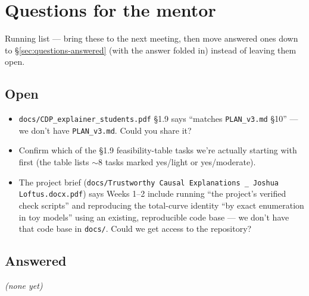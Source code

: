\section{Questions for the mentor}
\label{sec:questions}

Running list --- bring these to the next meeting, then move answered ones
down to \S\ref{sec:questions-answered} (with the answer folded in) instead
of leaving them open.

\subsection*{Open}
\begin{itemize}[label=$\square$]
  \item \texttt{docs/CDP\_explainer\_students.pdf} \S1.9 says ``matches
    \texttt{PLAN\_v3.md} \S10'' --- we don't have \texttt{PLAN\_v3.md}.
    Could you share it?
  \item Confirm which of the \S1.9 feasibility-table tasks we're actually
    starting with first (the table lists $\sim$8 tasks marked
    yes/light or yes/moderate).
  \item The project brief (\texttt{docs/Trustworthy Causal Explanations \_
    Joshua Loftus.docx.pdf}) says Weeks 1--2 include running ``the project's
    verified check scripts'' and reproducing the total-curve identity ``by
    exact enumeration in toy models'' using an existing, reproducible code
    base --- we don't have that code base in \texttt{docs/}. Could we get
    access to the repository?
\end{itemize}

\subsection*{Answered}
\label{sec:questions-answered}
\emph{(none yet)}
